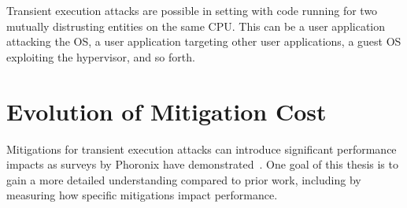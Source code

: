 Transient execution attacks are possible in setting with code running for two mutually distrusting entities on the same CPU.
This can be a user application attacking the OS, a user application targeting other user applications, a guest OS exploiting the hypervisor, and so forth.






\section{Evolution of Mitigation Cost}
Mitigations for transient execution attacks can introduce significant performance impacts as surveys by Phoronix have demonstrated~\cite{phoronix:perf-zombieload, phoronix:two-years, phoronix:three-years}.
One goal of this thesis is to gain a more detailed understanding compared to prior work, including by measuring how specific mitigations impact performance.

